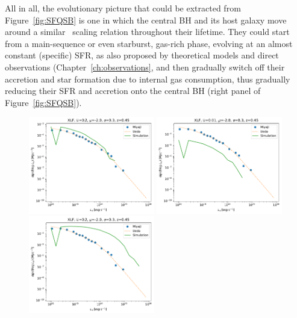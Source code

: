 All in all, the evolutionary picture that could be extracted from Figure~\ref{fig:SFQSB} is one in which the central BH and its host galaxy move around a similar \MBHMS\ scaling relation throughout their lifetime. They could start from a main-sequence or even starburst, gas-rich phase, evolving at an almost constant (specific) SFR, as also proposed by theoretical models \citep[e.g.][]{2014ApJ...782...69L, Aversa15} and direct observations (Chapter~\ref{ch:observations}, and then gradually switch off their accretion and star formation due to internal gas consumption, thus gradually reducing their SFR and accretion onto the central BH (right panel of Figure~\ref{fig:SFQSB}). 

\begin{figure}
	\includegraphics[width=0.49\textwidth]{Figs/Chapter3/XLF_z0.45_mean-2.00_sigma0.30_const0.2.pdf}
	\includegraphics[width=0.49\textwidth]{Figs/Chapter3/XLF_z0.45_mean-2.00_sigma0.30_const0.01.pdf}
	\includegraphics[width=0.49\textwidth]{Figs/Chapter3/XLF_z0.45_mean-2.00_sigma0.30Sahu19_const0.2.pdf}

\end{figure}
